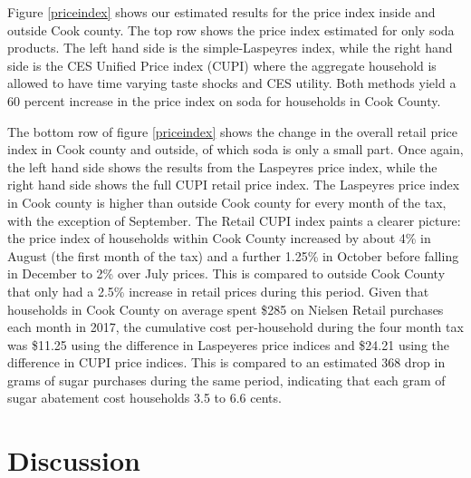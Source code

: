 \documentclass[12pt]{article}
\begin{document}
Figure \ref{priceindex} shows our estimated results for the price index inside and outside Cook county. The top row shows the price index estimated for only soda products. The left hand side is the simple-Laspeyres index, while the right hand side is the CES Unified Price index (CUPI) where the aggregate household is allowed to have time varying taste shocks and CES utility. Both methods yield a 60 percent increase in the price index on soda for households in Cook County.

The bottom row of figure \ref{priceindex} shows the change in the overall retail price index in Cook county and outside, of which soda is only a small part. Once again, the left hand side shows the results from the Laspeyres price index, while the right hand side shows the full CUPI retail price index. The Laspeyres price index in Cook county is higher than outside Cook county for every month of the tax, with the exception of September. The Retail CUPI index paints a clearer picture: the price index of households within Cook County increased by about 4\% in August (the first month of the tax) and a further 1.25\% in October before falling in December to 2\% over July prices. This is compared to outside Cook County that only had a 2.5\% increase in retail prices during this period. Given that households in Cook County on average spent \$285 on Nielsen Retail purchases each month in 2017, the cumulative cost per-household during the four month tax was \$11.25 using the difference in Laspeyeres price indices and \$24.21 using the difference in CUPI price indices. This is compared to an estimated 368 drop in grams of sugar purchases during the same period, indicating that each gram of sugar abatement cost households 3.5 to 6.6 cents.



\section{Discussion} \label{discussion}


\end{document}
